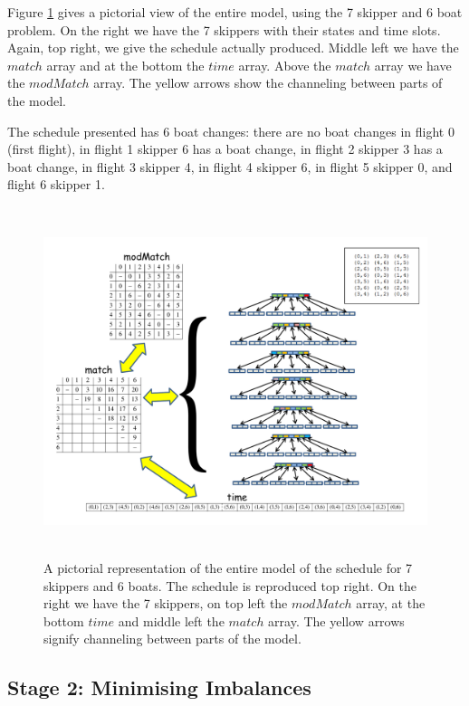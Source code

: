 \documentclass{llncs}
\newcommand{\match}{\mathit{match}}
\newcommand{\modMatch}{\mathit{modMatch}}
\newcommand{\timeVar}{\mathit{time}}
\begin{document}
\bigskip \noindent Figure \ref{schedChanges} gives a pictorial view of the entire model, using the 7
skipper and 6 boat problem. On the right we have the 7 skippers with their states and time slots.
Again, top right, we give the schedule actually produced.  Middle left we have the $\match$ array
and at the bottom the $\timeVar$ array. Above the $match$ array we have the $\modMatch$ array. The
yellow arrows show the channeling between parts of the model.

The schedule presented has 6 boat changes: there are no boat changes in flight 0 (first flight), in
flight 1 skipper 6 has a boat change, in flight 2 skipper 3 has a boat change, in flight 3 skipper
4, in flight 4 skipper 6, in flight 5 skipper 0, and flight 6 skipper 1.

\begin{figure}[tb]
\centering
\includegraphics[height=10.2cm,width=13.2cm]{schedule.pdf}
\caption{A pictorial representation of the entire model of the schedule for 7 skippers and 6 boats.
The schedule is reproduced top right. On the right we have the 7 skippers, on top left the
$\modMatch$ array, at the bottom $\timeVar$ and middle left the $\match$ array. The yellow arrows
signify channeling between parts of the model.}
\label{schedChanges}
\end{figure}

\subsection{Stage 2: Minimising Imbalances}
\end{document}

